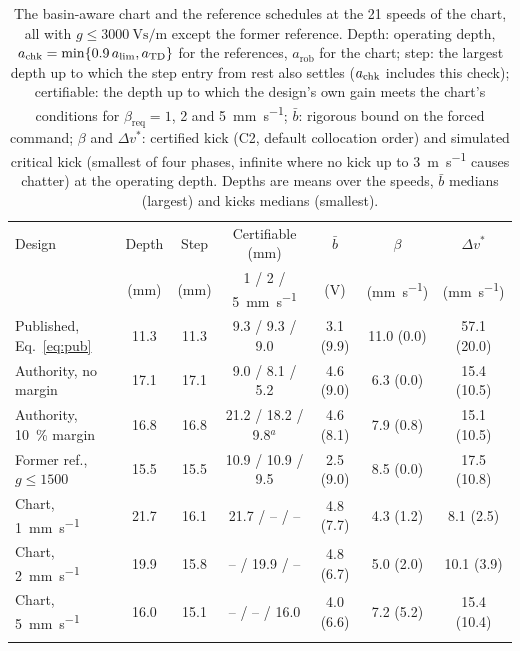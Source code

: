 \begin{table}[!tbp]
  \centering
  \caption{The basin-aware chart and the reference schedules at the 21 speeds of the chart, all with $g\le\SI{3000}{\volt\second\per\metre}$ except the former reference. Depth: operating depth, $a_{\mathrm{chk}}=\min\{0.9\,a_{\lim},a_{\mathrm{TD}}\}$ for the references, $a_{\mathrm{rob}}$ for the chart; step: the largest depth up to which the step entry from rest also settles ($a_{\mathrm{chk}}$ includes this check); certifiable: the depth up to which the design's own gain meets the chart's conditions for $\beta_{\mathrm{req}}=1$, 2 and \SI{5}{\milli\metre\per\second}; $\bar b$: rigorous bound on the forced command; $\beta$ and $\Delta v^*$: certified kick (C2, default collocation order) and simulated critical kick (smallest of four phases, infinite where no kick up to \SI{3}{\metre\per\second} causes chatter) at the operating depth. Depths are means over the speeds, $\bar b$ medians (largest) and kicks medians (smallest).}
  \label{tab:ba}
  \footnotesize
  \setlength{\tabcolsep}{3pt}
  \begin{tabular}{@{}lcccccc@{}}
    \toprule
    Design & Depth & Step & Certifiable (\si{\milli\metre}) & $\bar b$ & $\beta$ & $\Delta v^*$\\
     & (\si{\milli\metre}) & (\si{\milli\metre}) & 1 / 2 / \SI{5}{\milli\metre\per\second} & (\si{\volt}) & (\si{\milli\metre\per\second}) & (\si{\milli\metre\per\second})\\
    \midrule
    Published, Eq.~\eqref{eq:pub} & 11.3 & 11.3 & 9.3 / 9.3 / 9.0 & 3.1 (9.9) & 11.0 (0.0) & 57.1 (20.0)\\
    Authority, no margin & 17.1 & 17.1 & 9.0 / 8.1 / 5.2 & 4.6 (9.0) & 6.3 (0.0) & 15.4 (10.5)\\
    Authority, \SI{10}{\percent} margin & 16.8 & 16.8 & 21.2 / 18.2 / 9.8$^{a}$ & 4.6 (8.1) & 7.9 (0.8) & 15.1 (10.5)\\
    Former ref., $g\le1500$ & 15.5 & 15.5 & 10.9 / 10.9 / 9.5 & 2.5 (9.0) & 8.5 (0.0) & 17.5 (10.8)\\
    \addlinespace
    Chart, \SI{1}{\milli\metre\per\second} & 21.7 & 16.1 & 21.7 / -- / -- & 4.8 (7.7) & 4.3 (1.2) & 8.1 (2.5)\\
    Chart, \SI{2}{\milli\metre\per\second} & 19.9 & 15.8 & -- / 19.9 / -- & 4.8 (6.7) & 5.0 (2.0) & 10.1 (3.9)\\
    Chart, \SI{5}{\milli\metre\per\second} & 16.0 & 15.1 & -- / -- / 16.0 & 4.0 (6.6) & 7.2 (5.2) & 15.4 (10.4)\\
    \addlinespace
    \multicolumn{7}{@{}l}{\emph{With the depth margin $a\le0.9\,\alim$ also in the chart}}\\

\end{tabular}
\end{table}
